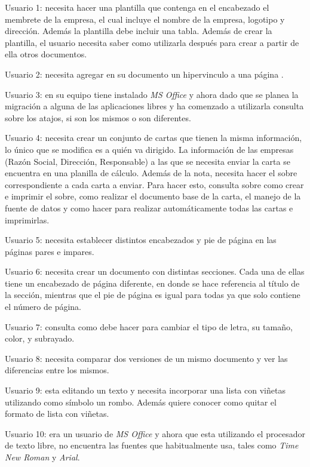 \documentclass[12pt]{article}
\begin{document}
\begin{description}

    \item{Usuario 1}: necesita hacer una plantilla que contenga en el
    encabezado el membrete de la empresa, el cual incluye el nombre de la
    empresa, logotipo y dirección. Además la plantilla debe incluir una tabla.
    Además de crear la plantilla, el usuario necesita saber como utilizarla
    después para crear a partir de ella otros documentos.

    \item{Usuario 2}: necesita agregar en su documento un hipervinculo a una
    página .

    \item{Usuario 3}: en su equipo tiene instalado \emph{MS Office} y ahora
    dado que se planea la migración a alguna de las aplicaciones libres y ha
    comenzado a utilizarla consulta sobre los atajos, si son los mismos o son
    diferentes.

    \item{Usuario 4}: necesita crear un conjunto de cartas que tienen la misma
    información, lo único que se modifica es a quién va dirigido. La
    información de las empresas (Razón Social, Dirección, Responsable) a las
    que se necesita enviar la carta se encuentra en una planilla de cálculo.
    Además de la nota, necesita hacer el sobre correspondiente a cada carta a
    enviar. Para hacer esto, consulta sobre como crear e imprimir el sobre,
    como realizar el documento base de la carta, el manejo de la fuente de
    datos y como hacer para realizar automáticamente todas las cartas e
    imprimirlas.

    \item{Usuario 5}: necesita establecer distintos encabezados y pie de
    página en las páginas pares e impares.

    \item{Usuario 6}: necesita crear un documento con distintas secciones.
    Cada una de ellas tiene un encabezado de página diferente, en donde se
    hace referencia al título de la sección, mientras que el pie de página es
    igual para todas ya que solo contiene el número de página.

    \item{Usuario 7}: consulta como debe hacer para cambiar el tipo de letra,
    su tamaño, color, y subrayado.

    \item{Usuario 8}: necesita comparar dos versiones de un mismo documento y
    ver las diferencias entre los mismos.

    \item{Usuario 9}: esta editando un texto y necesita incorporar una lista
    con viñetas utilizando como símbolo un rombo. Además quiere conocer como
    quitar el formato de lista con viñetas.

    \item{Usuario 10}: era un usuario de \emph{MS Office} y ahora que esta
    utilizando el procesador de texto libre, no encuentra las fuentes que
    habitualmente usa, tales como \emph{Time New Roman} y \emph{Arial}.

\end{description}
\end{document}
